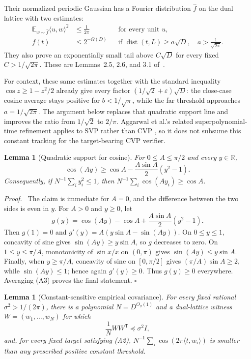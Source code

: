 \documentclass[11pt]{article}
\newtheorem{lemma}[theorem]{Lemma}
\newenvironment{proof}{\par\noindent\textit{Proof.}\ }{\hfill$\square$\par}
\begin{document}
Their normalized periodic Gaussian has a Fourier distribution $\widehat f$
on the dual lattice with two estimates:
\begin{align}
  \mathbb E_{w\sim\widehat f}\langle u,w\rangle^2
    &\le \frac{1}{2\pi} &&\text{for every unit }u,       \tag{A1}\\
  f(t)&\le 2^{-\Omega(D)}
    &&\text{if }\operatorname{dist}(t,L)\ge a\sqrt D,
      \quad a>\frac1{\sqrt{2\pi}}.                      \tag{A2}
\end{align}
They also prove an exponentially small tail above $C\sqrt D$ for every fixed
$C>1/\sqrt{2\pi}$.  These are Lemmas~2.5, 2.6, and 3.1 of~\cite{AR05}.

For context, these same estimates together with the standard inequality
$\cos z\ge1-z^2/2$ already give every factor
$(1/\sqrt2+\varepsilon)\sqrt D$: the close-case cosine average stays positive
for $b<1/\sqrt\pi$, while the far threshold approaches
$a=1/\sqrt{2\pi}$.  The argument below replaces that quadratic support line
and improves the ratio from $1/\sqrt2$ to $2/\pi$.  Aggarwal et al.'s related
superpolynomial-time refinement applies to SVP rather than CVP
\cite[Theorem~1.2]{ABBGKLPV22}, so it does not subsume this constant tracking
for the target-bearing CVP verifier.

\begin{lemma}[Quadratic support for cosine]                 \label{lem:cosine}
For $0\le A\le\pi/2$ and every $y\in\mathbb R$,
\[
  \cos(Ay)\ge
  \cos A-\frac{A\sin A}{2}(y^2-1).                       \tag{A3}
\]
Consequently, if $N^{-1}\sum_i y_i^2\le1$, then
$N^{-1}\sum_i\cos(Ay_i)\ge\cos A$.
\end{lemma}

\begin{proof}
The claim is immediate for $A=0$, and the difference between the two sides
is even in $y$.  For $A>0$ and $y\ge0$, let
\[
  g(y)=\cos(Ay)-\cos A+\frac{A\sin A}{2}(y^2-1).
\]
Then $g(1)=0$ and $g'(y)=A(y\sin A-\sin(Ay))$.  On $0\le y\le1$, concavity
of sine gives $\sin(Ay)\ge y\sin A$, so $g$ decreases to zero.  On
$1\le y\le\pi/A$, monotonicity of $\sin x/x$ on $(0,\pi)$ gives
$\sin(Ay)\le y\sin A$.  Finally, when $y\ge\pi/A$, concavity of sine on
$[0,\pi/2]$ gives $(\pi/A)\sin A\ge2$, while $\sin(Ay)\le1$; hence again
$g'(y)\ge0$.  Thus $g(y)\ge0$ everywhere.  Averaging (A3) proves the final
statement.
\end{proof}

\begin{lemma}[Constant-sensitive empirical covariance]
For every fixed rational $\sigma^2>1/(2\pi)$, there is a polynomial
$N=D^{O_\sigma(1)}$ and a dual-lattice witness
$W=(w_1,\ldots,w_N)$ for which
\[
  \frac1NWW^{\mathsf T}\preceq
    \sigma^2 I,                                         \tag{A4}
\]
and, for every fixed target satisfying (A2),
$N^{-1}\sum_i\cos(2\pi\langle t,w_i\rangle)$ is smaller than any prescribed
positive constant threshold.
\end{lemma}
\end{document}
